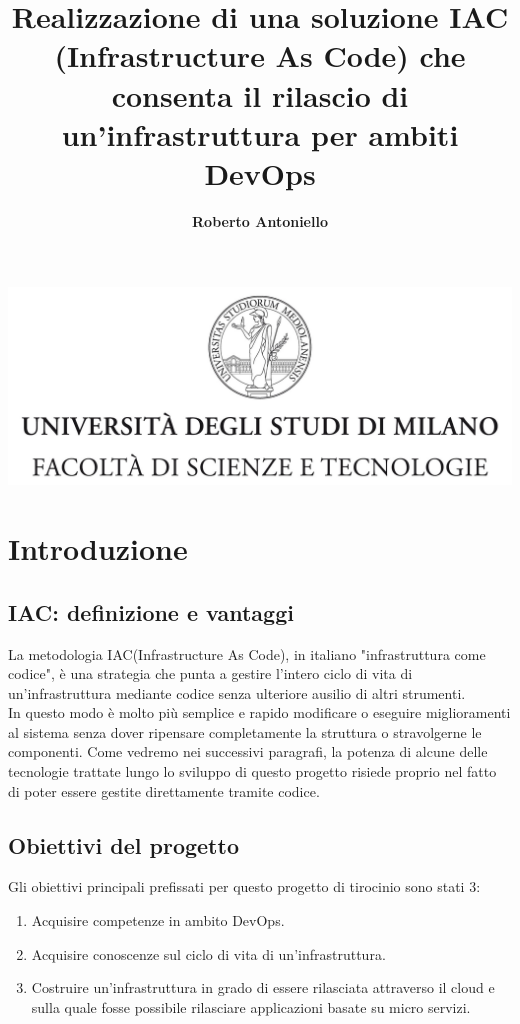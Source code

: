 \documentclass[a4paper,12pt]{report}
\begin{document}
\includegraphics[width=\textwidth]{Logo.jpg}
\title{Realizzazione di una soluzione IAC (Infrastructure As Code) che consenta il rilascio di un'infrastruttura per ambiti DevOps}
\author{\textbf{Roberto Antoniello}}

\beforepreface

\afterpreface
% 
% 
% 
\chapter{Introduzione}
\section{IAC: definizione e vantaggi}
La metodologia IAC(Infrastructure As Code), in italiano "infrastruttura come codice", è una strategia che punta a gestire l'intero ciclo di vita di un'infrastruttura mediante codice senza ulteriore ausilio di altri strumenti. \\ In questo modo è molto più semplice e rapido modificare o eseguire miglioramenti al sistema senza dover ripensare completamente la struttura o stravolgerne le componenti.
Come vedremo nei successivi paragrafi, la potenza di alcune delle tecnologie trattate lungo lo sviluppo di questo progetto risiede proprio nel fatto di poter essere gestite direttamente tramite codice.
\section{Obiettivi del progetto}
Gli obiettivi principali prefissati per questo progetto di tirocinio sono stati 3:
\begin{enumerate}
\item Acquisire competenze in ambito DevOps.
\item Acquisire conoscenze sul ciclo di vita di un'infrastruttura.
\item Costruire un'infrastruttura in grado di essere rilasciata attraverso il cloud e sulla quale fosse possibile rilasciare applicazioni basate su micro servizi.
\end{enumerate}
\end{document}
